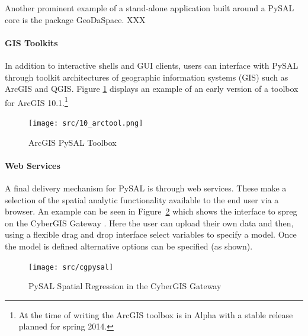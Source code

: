 \documentclass[11pt, titlepage]{article}
\begin{document}
Another prominent example of a stand-alone application built around a
PySAL core is the package GeoDaSpace. XXX

\paragraph{GIS Toolkits}

In addition to interactive shells and GUI clients, users can interface
with PySAL through toolkit architectures of geographic information
systems (GIS) such as ArcGIS and QGIS. Figure \ref{f:arcgis} displays an example of an
early version of a toolbox for ArcGIS 10.1.\footnote{At the time of
  writing the ArcGIS toolbox is in Alpha with a stable release planned
  for spring 2014.}


\begin{figure}[ht]
\begin{center}
\texttt{[image: src/10\_arctool.png]}
\end{center}
\caption{ArcGIS PySAL Toolbox}
\label{f:arcgis}
\end{figure}   


\paragraph{Web Services}

A final delivery mechanism for PySAL is through web services. These make
a selection of the spatial analytic functionality available to the end
user via a browser. An example can be seen in Figure~\ref{f:cgpysal}
which shows the interface to spreg on the CyberGIS Gateway \citep{Wang:2010sg}.
Here the user can upload their own data and then, using a flexible drag
and drop interface select variables to
specify a model. Once the model is defined alternative options can be
specified (as shown). 

\begin{figure}[ht]
\begin{center}
\texttt{[image: src/cgpysal]}
\end{center}
\caption{PySAL Spatial Regression in the CyberGIS Gateway}
\label{f:cgpysal}
\end{figure}   
\end{document}
